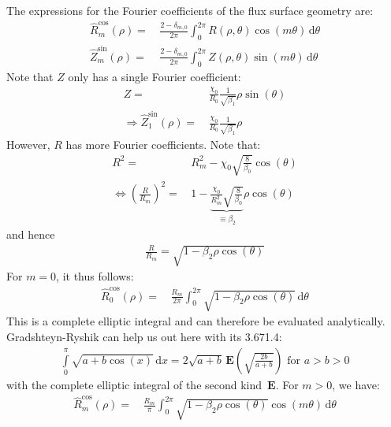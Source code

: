 The expressions for the Fourier coefficients of the flux surface geometry are:
\begin{align}
 \hat{R}^\textrm{cos}_m(\rho) =&\,
   \frac{2 - \delta_{m,0}}{2 \pi}
   \int_{0}^{2 \pi}
     R(\rho, \theta) \cos(m \theta) \,\mathrm{d}\theta \\
 \hat{Z}^\textrm{sin}_m(\rho) =&\,
   \frac{2 - \delta_{m,0}}{2 \pi}
   \int_{0}^{2 \pi}
     Z(\rho, \theta) \sin(m \theta) \,\mathrm{d}\theta
\end{align}
Note that $Z$ only has a single Fourier coefficient:
\begin{align}
 Z =&\, \frac{\chi_0}{R_0} \frac{1}{\sqrt{\beta_1}} \rho \sin(\theta) \\
 \Rightarrow
 \hat{Z}^\textrm{sin}_1(\rho) =&\, \frac{\chi_0}{R_0} \frac{1}{\sqrt{\beta_1}} \rho
\end{align}
However, $R$ has more Fourier coefficients.
Note that:
\begin{align}
  R^2 =&\, R_m^2 - \chi_0 \sqrt{\frac{8}{\beta_0}} \cos(\theta) \\
  \Leftrightarrow
  \left( \frac{R}{R_m} \right)^2
    =&\, 1 - \underbrace{\frac{\chi_0}{R_m^2} \sqrt{\frac{8}{\beta_0}}}_{\equiv \beta_2} \rho \cos(\theta)
\end{align}
and hence
\begin{align}
 \frac{R}{R_m} = \sqrt{ 1 - \beta_2 \rho \cos(\theta) }
\end{align}
For $m=0$, it thus follows:
\begin{align}
 \hat{R}^\textrm{cos}_0(\rho)
 =&\,
   \frac{R_m}{2 \pi}
   \int_{0}^{2 \pi}
     \sqrt{ 1 - \beta_2 \rho \cos(\theta) }
     \,\mathrm{d}\theta
\end{align}
%
This is a complete elliptic integral
and can therefore be evaluated analytically.
%
Gradshteyn-Ryshik can help us out here with its 3.671.4:
\begin{align}
 \int\limits_0^\pi \sqrt{a + b \cos(x)} \,\textrm{d}x
 =
 2 \sqrt{a + b} \,\mathbf{E}\left( \sqrt{\frac{2 b}{a + b}} \right)
 \textrm{ for }
 a > b > 0
\end{align}
with the complete elliptic integral of the second kind~$\mathbf{E}$.
%
For $m>0$, we have:
\begin{align}
 \hat{R}^\textrm{cos}_m(\rho)
 =&\,
   \frac{R_m}{\pi}
   \int_{0}^{2 \pi}
     \sqrt{ 1 - \beta_2 \rho \cos(\theta) }
     \cos(m \theta)
     \,\mathrm{d}\theta \\
\end{align}

